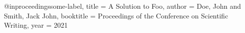 @inproceedings{some-label,
  title     = {{A} {S}olution to {F}oo},
  author    = {Doe, John and Smith, Jack John},
  booktitle = {Proceedings of the Conference on Scientific Writing},
  year      = {2021}
}
